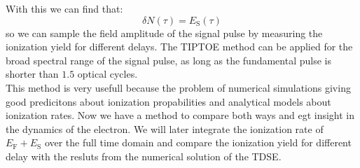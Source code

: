 With this we can find that:
\begin{equation*}
    \delta N(\tau)=E_{\mathrm{S}}(\tau)
\end{equation*}
so we can sample the field amplitude of the signal pulse by measuring the ionization yield for different delays.
The TIPTOE method can be applied for the broad spectral range of the signal pulse, as long as the fundamental pulse is shorter than $1.5$ optical cycles.\\
This method is very usefull because the problem of numerical simulations giving good predicitons about ionization propabilities and analytical models about ionization rates.
Now we have a method to compare both ways and egt insight in the dynamics of the electron. 
We will later integrate the ionization rate of $E_{\mathrm{F}}+E_{\mathrm{S}}$ over the full time domain and compare the ionization yield for different delay with the resluts from the numerical solution of the TDSE.
